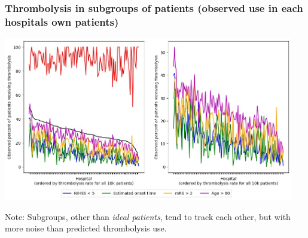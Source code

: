 \begin{frame}
\frametitle{Thrombolysis in subgroups of patients (observed use in each hospitals own patients)}

    \begin{center}
    \includegraphics[width=0.95\textwidth]{./images/15a_xgb_10_features_10k_cohort_actual_subgroup}
    \end{center}

\footnotesize Note: Subgroups, other than \emph{ideal patients}, tend to track each other, but with more noise than predicted thrombolysis use. 

\end{frame}
